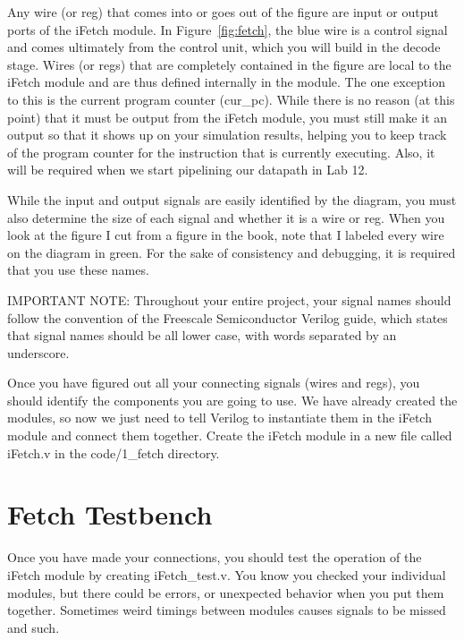 Any wire (or reg) that comes into or goes out of the figure are input or output ports of the iFetch module.  In Figure~\ref{fig:fetch}, the blue wire is a control signal and comes ultimately from the control unit, which you will build in the decode stage.   Wires (or regs) that are completely contained in the figure are local to the iFetch module and are thus defined internally in the module.  The one exception to this is the current program counter (cur\_pc).  While there is no reason (at this point) that it must be output from the iFetch module, you must still make it an output so that it shows up on your simulation results, helping you to keep track of the program counter for the instruction that is currently executing.  Also, it will be required when we start pipelining our datapath in Lab 12.

While the input and output signals are easily identified by the diagram, you must also determine the size of each signal and whether it is a wire or reg.  When you look at the figure I cut from a figure in the book, note that I labeled every wire on the diagram in green.  For the sake of consistency and debugging, it is required that you use these names.  

IMPORTANT NOTE: Throughout your entire project, your signal names should follow the convention of the Freescale Semiconductor Verilog guide, which states that signal names should be all lower case, with words separated by an underscore.   

Once you have figured out all your connecting signals (wires and regs), you should identify the components you are going to use.  We have already created the modules, so now we just need to tell Verilog to instantiate them in the iFetch module and connect them together.  Create the iFetch module in a new file called iFetch.v in the code/1\_fetch directory.  

\section{Fetch Testbench}
Once you have made your connections, you should test the operation of the iFetch module by creating iFetch\_test.v.  You know you checked your individual modules, but there could be errors, or unexpected behavior when you put them together.  Sometimes weird timings between modules causes signals to be missed and such.  

